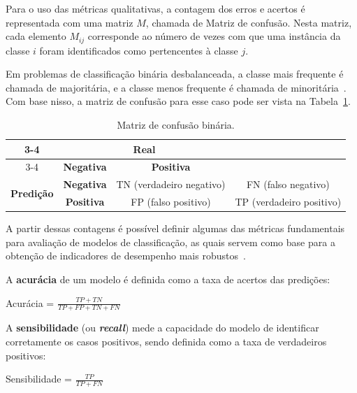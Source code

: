 Para o uso das métricas qualitativas, a contagem dos erros e acertos é representada com uma matriz \(M\), chamada de Matriz de confusão. Nesta matriz, cada elemento \(M_{ij}\) corresponde ao número de vezes com que uma instância da classe \(i\) foram identificados como pertencentes à classe \(j\).

Em problemas de classificação binária desbalanceada, a classe mais frequente é chamada de majoritária, e a classe menos frequente é chamada de minoritária~\cite{Seiffert2008,Batuwita2010}. Com base nisso, a matriz de confusão para esse caso pode ser vista na Tabela~\ref{tab:matriz-confusao}.

\begin{table}[htbp]
  \centering
  \begin{tabular}{cc|cc|}
    \cline{3-4}
    \multicolumn{2}{c|}{\multirow{2}{*}{}}                   & \multicolumn{2}{c|}{\textbf{Real}}                                                                                \\ \cline{3-4}
    \multicolumn{2}{c|}{}                                    & \multicolumn{1}{c|}{\textbf{Negativa}} & \textbf{Positiva}                                                        \\ \hline
    \multicolumn{1}{|c|}{\multirow{2}{*}{\textbf{Predição}}} & \textbf{Negativa}                      & \multicolumn{1}{c|}{TN (verdadeiro negativo)} & FN (falso negativo)      \\ \cline{2-4}
    \multicolumn{1}{|c|}{}                                   & \textbf{Positiva}                      & \multicolumn{1}{c|}{FP (falso positivo)}      & TP (verdadeiro positivo) \\ \hline
  \end{tabular}
  \caption{Matriz de confusão binária.}
  \label{tab:matriz-confusao}
\end{table}

A partir dessas contagens é possível definir algumas das métricas fundamentais para avaliação de modelos de classificação, as quais servem como base para a obtenção de indicadores de desempenho mais robustos~\cite{Naidu2023}.

A \textbf{acurácia} de um modelo é definida como a taxa de acertos das predições:
\begin{center}
  Acurácia = $\frac{TP + TN}{TP + FP + TN + FN}$
  \label{eq:acuracia}
\end{center}

A \textbf{sensibilidade} (ou \textbf{\textit{recall}}) mede a capacidade do modelo de identificar corretamente os casos positivos, sendo definida como a taxa de verdadeiros positivos:
\begin{center}
  Sensibilidade = $\frac{TP}{TP + FN}$
  \label{eq:sensibilidade}
\end{center}

